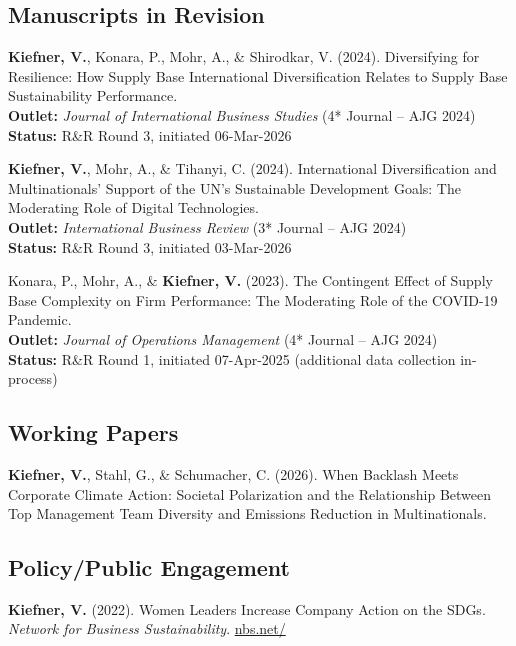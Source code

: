 \documentclass[11pt,a4paper]{article}
\begin{document}
\begin{cv}
\subsection{Manuscripts in Revision}
\begin{cvlist}{}
    \item[2026]
      \textbf{Kiefner, V.}, Konara, P., Mohr, A., \& Shirodkar, V. (2024). 
      Diversifying for Resilience: How Supply Base International Diversification Relates to Supply Base Sustainability Performance.\\
      \textbf{Outlet:} \textit{Journal of International Business Studies} (4* Journal -- AJG 2024)\\
      \textbf{Status:} R\&R Round 3, initiated 06-Mar-2026

    \item[2026]
      \textbf{Kiefner, V.}, Mohr, A., \& Tihanyi, C. (2024). 
      International Diversification and Multinationals' Support of the UN's Sustainable Development Goals: The Moderating Role of Digital Technologies.\\
      \textbf{Outlet:} \textit{International Business Review} (3* Journal -- AJG 2024)\\
      \textbf{Status:} R\&R Round 3, initiated 03-Mar-2026

    \item[2025]
      Konara, P., Mohr, A., \& \textbf{Kiefner, V.} (2023). 
      The Contingent Effect of Supply Base Complexity on Firm Performance: The Moderating Role of the COVID-19 Pandemic.\\
      \textbf{Outlet:} \textit{Journal of Operations Management} (4* Journal -- AJG 2024)\\
      \textbf{Status:} R\&R Round 1, initiated 07-Apr-2025 (additional data collection in-process)
\end{cvlist}

\subsection{Working Papers}
\begin{cvlist}{}
    \item[In Preparation]
      \textbf{Kiefner, V.}, Stahl, G., \& Schumacher, C. (2026). 
      When Backlash Meets Corporate Climate Action: Societal Polarization and the Relationship Between Top Management Team Diversity and Emissions Reduction in Multinationals.
\end{cvlist}

\subsection{Policy/Public Engagement}
\begin{cvlist}{}
    \item[2022]
      \textbf{Kiefner, V.} (2022). Women Leaders Increase Company Action on the SDGs. \textit{Network for Business Sustainability}. \href{https://nbs.net/women-leaders-increase-company-action-on-the-sdgs/}{nbs.net/}\\
\end{cvlist}


\end{cv}
\end{document}
